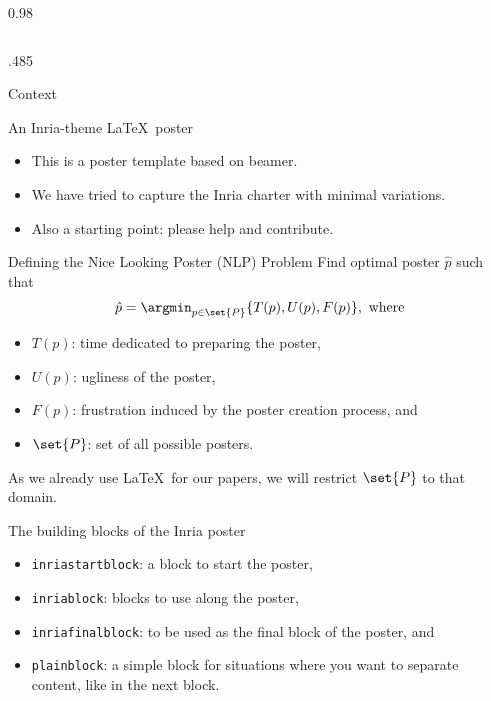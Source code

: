 \documentclass[final,svgnames,english]{beamer}
\begin{document}
\begin{frame}[fragile]{}
\begin{columns}[T]
\begin{column}{0.98\linewidth}
\begin{columns}[T]
\begin{column}{.485\linewidth}
\begin{inriastartblock}{Context}
\begin{itemize}
            \end{itemize}
        \end{inriastartblock}
        \begin{inriablock}{An Inria-theme \LaTeX\ poster}
            \begin{itemize}
              \item This is a poster template based on beamer.
              \item We have tried to capture the Inria charter with minimal variations.
              \item Also a starting point: please help and contribute.
            \end{itemize}
          \end{inriablock}

          \begin{inriablock}{Defining the Nice Looking Poster (NLP) Problem}
            Find optimal poster $\hat{p}$ such that
            \[
              \hat{p} = \argmin_{p\in\set{P}}{\left\lbrace T(p), U(p), F(p)\right\rbrace},\ \text{where}
            \]
            \begin{itemize}
              \item $T(p)$: time dedicated to preparing the poster,
              \item $U(p)$: ugliness of the poster,
              \item $F(p)$: frustration induced by the poster creation process, and
              \item $\set{P}$: set of all possible posters.
            \end{itemize}
            \begin{takeaway}
              As we already use \LaTeX\ for our papers, we will restrict $\set{P}$ to that domain.
            \end{takeaway}
          \end{inriablock}

          \begin{inriablock}{The building blocks of the Inria poster}
            \begin{itemize}
              \item \texttt{inriastartblock}: a block to start the poster,
              \item \texttt{inriablock}: blocks to use along the poster,
              \item \texttt{inriafinalblock}: to be used as the final block of the poster, and
              \item \texttt{plainblock}: a simple block for situations where you want to separate content, like in the next block.
            \end{itemize}
          \end{inriablock}


\end{column}
\end{columns}
\end{column}
\end{columns}
\end{frame}
\end{document}

